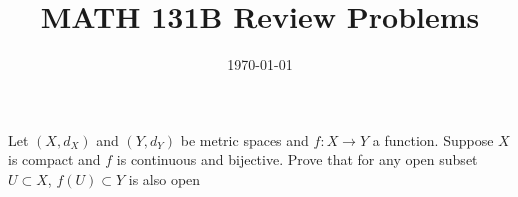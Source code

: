 \documentclass{article}
\date{\today}
\title{MATH 131B Review Problems}
\begin{document}
\maketitle

\begin{prob}
    Let $(X, d_X)$ and $(Y, d_Y)$ be metric spaces and $f: X \rightarrow Y$ a function. Suppose $X$ is compact and $f$ is continuous and bijective. Prove that for any open subset $U \subset X$, $f(U)\subset Y$ is also open
\end{prob}
\end{document}
